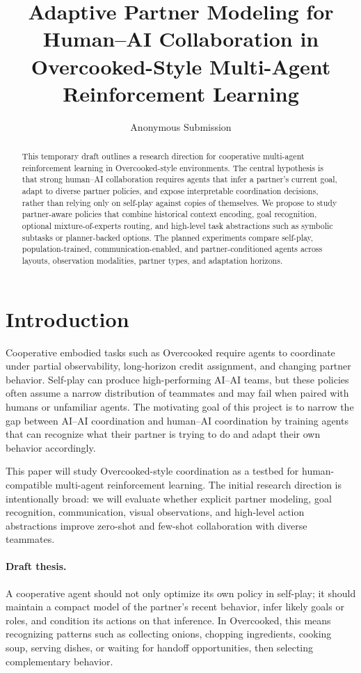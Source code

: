 \documentclass[letterpaper]{article} %
\title{Adaptive Partner Modeling for Human--AI Collaboration in Overcooked-Style Multi-Agent Reinforcement Learning}
\author{Anonymous Submission}
\begin{document}
\maketitle

\begin{abstract}
This temporary draft outlines a research direction for cooperative multi-agent reinforcement learning in Overcooked-style environments. The central hypothesis is that strong human--AI collaboration requires agents that infer a partner's current goal, adapt to diverse partner policies, and expose interpretable coordination decisions, rather than relying only on self-play against copies of themselves. We propose to study partner-aware policies that combine historical context encoding, goal recognition, optional mixture-of-experts routing, and high-level task abstractions such as symbolic subtasks or planner-backed options. The planned experiments compare self-play, population-trained, communication-enabled, and partner-conditioned agents across layouts, observation modalities, partner types, and adaptation horizons.
\end{abstract}

\section{Introduction}

Cooperative embodied tasks such as Overcooked require agents to coordinate under partial observability, long-horizon credit assignment, and changing partner behavior. Self-play can produce high-performing AI--AI teams, but these policies often assume a narrow distribution of teammates and may fail when paired with humans or unfamiliar agents. The motivating goal of this project is to narrow the gap between AI--AI coordination and human--AI coordination by training agents that can recognize what their partner is trying to do and adapt their own behavior accordingly.

This paper will study Overcooked-style coordination as a testbed for human-compatible multi-agent reinforcement learning. The initial research direction is intentionally broad: we will evaluate whether explicit partner modeling, goal recognition, communication, visual observations, and high-level action abstractions improve zero-shot and few-shot collaboration with diverse teammates.

\paragraph{Draft thesis.}
A cooperative agent should not only optimize its own policy in self-play; it should maintain a compact model of the partner's recent behavior, infer likely goals or roles, and condition its actions on that inference. In Overcooked, this means recognizing patterns such as collecting onions, chopping ingredients, cooking soup, serving dishes, or waiting for handoff opportunities, then selecting complementary behavior.
\end{document}
